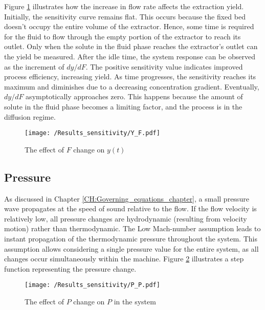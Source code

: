\documentclass[../Article_Design_of_Experiment.tex]{subfiles}
\begin{document}
    Figure \ref{fig:Sensitivty_F_y} illustrates how the increase in flow rate affects the extraction yield. Initially, the sensitivity curve remains flat. This occurs because the fixed bed doesn't occupy the entire volume of the extractor. Hence, some time is required for the fluid to flow through the empty portion of the extractor to reach its outlet. Only when the solute in the fluid phase reaches the extractor's outlet can the yield be measured. After the idle time, the system response can be observed as the increment of  $dy/dF$. The positive sensitivity value indicates improved process efficiency, increasing yield. As time progresses, the sensitivity reaches its maximum and diminishes due to a decreasing concentration gradient. Eventually, $dy/dF$ asymptotically approaches zero. This happens because the amount of solute in the fluid phase becomes a limiting factor, and the process is in the diffusion regime.
    
    \begin{figure}[h!]
    	\centering
    	\texttt{[image: /Results\_sensitivity/Y\_F.pdf]}
    	\caption{The effect of $F$ change on $y(t)$}
    	\label{fig:Sensitivty_F_y}
    \end{figure}
    
    \subsection{Pressure}
    
    As discussed in Chapter \ref{CH:Governing_equations_chapter}, a small pressure wave propagates at the speed of sound relative to the flow. If the flow velocity is relatively low, all pressure changes are hydrodynamic (resulting from velocity motion) rather than thermodynamic. The Low Mach-number assumption leads to instant propagation of the thermodynamic pressure throughout the system. This assumption allows considering a single pressure value for the entire system, as all changes occur simultaneously within the machine. Figure \ref{fig:Sensitivty_P_P} illustrates a step function representing the pressure change.
    
    \begin{figure}[h!]
    	\centering
    	\texttt{[image: /Results\_sensitivity/P\_P.pdf]}
    	\caption{The effect of $P$ change on $P$ in the system}
    	\label{fig:Sensitivty_P_P}
    \end{figure}
    
\end{document}
